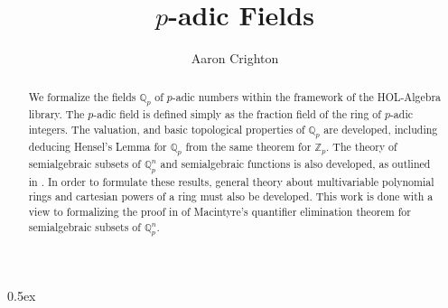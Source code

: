\documentclass[11pt,a4paper]{article}
\begin{document}
\title{$p$-adic Fields}
\author{Aaron Crighton}
\maketitle

\tableofcontents

\parindent 0pt\parskip 0.5ex


\begin{abstract}
We formalize the fields $\mathbb{Q}_p$ of $p$-adic numbers within the framework of the HOL-Algebra library. The $p$-adic field is defined simply as the fraction field of the ring of $p$-adic integers. The valuation, and basic topological properties of $\mathbb{Q}_p$ are developed, including deducing Hensel's Lemma for $\mathbb{Q}_p$ from the same theorem for $\mathbb{Z}_p$. The theory of semialgebraic subsets of $\mathbb{Q}_p^n$ and semialgebraic functions is also developed, as outlined in \cite{denef1986}. In order to formulate these results, general theory about multivariable polynomial rings and cartesian powers of a ring must also be developed. This work is done with a view to formalizing the proof in \cite{denef1986} of Macintyre's quantifier elimination theorem for semialgebraic subsets of $\mathbb{Q}_p^n$. 
\end{abstract}





\end{document}
